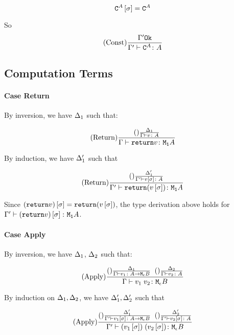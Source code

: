 \documentclass{report}
\begin{document}
    \begin{equation}
        \texttt{C}^{A}\left[\sigma\right] =\texttt{C}^{A}
    \end{equation}

    So \begin{equation}
        (\text{Const}) \frac{\Gamma' \texttt{Ok}}{\Gamma' \vdash \texttt{C}^{A} \colon A}
    \end{equation}
\subsection{Computation Terms}
\paragraph{Case Return}
    By inversion, we have $\Delta_1$ such that:

    \begin{equation}
        (\text{Return}) \frac{(\text{}) \frac{\Delta_1}{\Gamma \vdash v \colon A}}{\Gamma \vdash \texttt{return} v \colon \texttt{M}_{\texttt{1}}{A}}
    \end{equation}

    By induction, we have $\Delta_1'$ such that

    \begin{equation}
        (\text{Return}) \frac{(\text{}) \frac{\Delta'_1}{\Gamma' \vdash v\left[\sigma\right] \colon A}}{\Gamma' \vdash \texttt{return} (v\left[\sigma\right]) \colon \texttt{M}_{\texttt{1}}{A}}
    \end{equation}

    Since $(\texttt{return} v)\left[\sigma\right] = \texttt{return} (v\left[\sigma\right])$, the type derivation above holds for $\Gamma' \vdash (\texttt{return} v)\left[\sigma\right] \colon \texttt{M}_{\texttt{1}}{A}$.

\paragraph{Case Apply}
    By inversion, we have $\Delta_1$, $\Delta_2$ such that:

    \begin{equation}
        (\text{Apply}) \frac{
            (\text{}) \frac{\Delta_1}{\Gamma \vdash v_1 \colon A \rightarrow \texttt{M}_{\epsilon}{B}}
            \;\;
            (\text{}) \frac{\Delta_2}{\Gamma \vdash v_2 \colon A}
        }{\Gamma \vdash v_1\; v_2 \colon \texttt{M}_{\epsilon}{B}}
    \end{equation}

    By induction on $\Delta_1, \Delta_2$, we have $\Delta_1',\Delta_2'$ such that

    \begin{equation}
        (\text{Apply}) \frac{
            (\text{}) \frac{\Delta'_1}{\Gamma' \vdash v_1\left[\sigma\right] \colon A \rightarrow \texttt{M}_{\epsilon}{B}}
            \;\;
            (\text{}) \frac{\Delta_2'}{\Gamma' \vdash v_2\left[\sigma\right] \colon A}
        }{\Gamma' \vdash (v_1\left[\sigma\right])\;(v_2\left[\sigma\right]) \colon \texttt{M}_{\epsilon}{B}}
    \end{equation}
\end{document}
